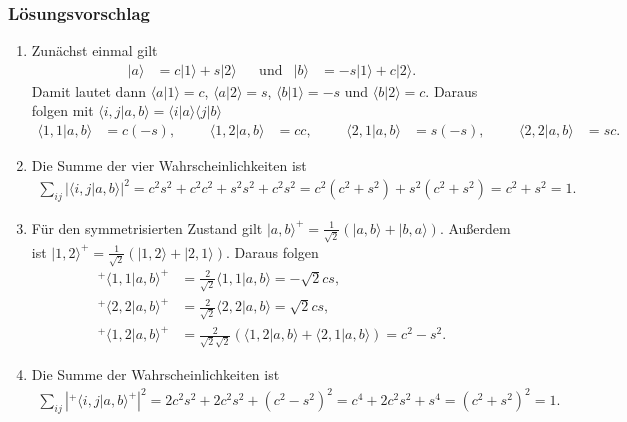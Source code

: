 \documentclass[german, parskip=full]{scrartcl}
\newcommand{\brak}{}
\newcommand{\kla}{}
\newcommand{\tecxt}{}
\newcommand{\Ket}{}
\begin{document}
\subsubsection*{Lösungsvorschlag}
\begin{enumerate}
\item[a)] Zunächst einmal gilt
\begin{align*}
\Ket | {a} \rangle&=c\Ket | {1} \rangle+s\Ket | {2} \rangle&&\tecxt\text{und}&\Ket | {b} \rangle&=-s\Ket | {1} \rangle+c\Ket | {2} \rangle.
\end{align*}
Damit lautet dann $\brak\langle {a}| {1}\rangle=c$, $\brak\langle {a}| {2}\rangle=s$, $\brak\langle {b}| {1}\rangle=-s$ und $\brak\langle {b}| {2}\rangle=c$.
Daraus folgen mit $\brak\langle {i,j}| {a,b}\rangle=\brak\langle {i}| {a}\rangle\brak\langle {j}| {b}\rangle$
\begin{align*}
\brak\langle {1,1}| {a,b}\rangle&=c(-s),&&&\brak\langle {1,2}| {a,b}\rangle&=cc,&&&\brak\langle {2,1}| {a,b}\rangle&=s(-s),&&&\brak\langle {2,2}| {a,b}\rangle&=sc.
\end{align*}
\item[b)] Die Summe der vier Wahrscheinlichkeiten ist
\begin{align*}
\sum_{ij}\vert\brak\langle {i,j}| {a,b}\rangle|^2=c^2s^2+c^2c^2+s^2s^2+c^2s^2=c^2(c^2+s^2)+s^2(c^2+s^2)=c^2+s^2=1.
\end{align*}
\item[c)] Für den symmetrisierten Zustand gilt $\Ket | {a,b} \rangle^+=\frac{1}{\sqrt{2}}\kla\left( {\Ket | {a,b} \rangle+\Ket | {b,a} \rangle} \right)$. 
Außerdem ist $\Ket | {1,2} \rangle^+=\frac{1}{\sqrt{2}}\kla\left( {\Ket | {1,2} \rangle+\Ket | {2,1} \rangle} \right)$.
Daraus folgen
\begin{align*}
{}^+\brak\langle {1,1}| {a,b}\rangle^+&=\frac{2}{\sqrt{2}}\brak\langle {1,1}| {a,b}\rangle=-\sqrt{2}cs,\\
{}^+\brak\langle {2,2}| {a,b}\rangle^+&=\frac{2}{\sqrt{2}}\brak\langle {2,2}| {a,b}\rangle=\sqrt{2}cs,\\
{}^+\brak\langle {1,2}| {a,b}\rangle^+&=\frac{2}{\sqrt{2}\sqrt{2}}\kla\left( {\brak\langle {1,2}| {a,b}\rangle+\brak\langle {2,1}| {a,b}\rangle} \right)=c^2-s^2.
\end{align*}
\item[d)] Die Summe der Wahrscheinlichkeiten ist
\begin{align*}
\sum_{ij}\left\vert {}^+\brak\langle {i,j}| {a,b}\rangle^+ \right\vert^2 =2c^2s^2+2c^2s^2+(c^2-s^2)^2=c^4+2c^2s^2+s^4=(c^2+s^2)^2=1.
\end{align*}

\end{enumerate}
\end{document}
